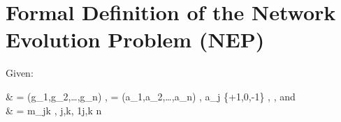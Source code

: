 \documentclass[12pt]{article}	%
\newcommand{\mys }{\hspace{0.1cm}}
\begin{document}
\section{Formal Definition of the Network Evolution Problem (NEP)} \label{sup_NEP_definition}
				\noindent Given: %
				\vspace{.3cm}
				{\small
						\begin{flalign*} %
							&\mys\mys{}  = (g_1,g_2,\dots,g_n) \textrm{, }    = (a_1,a_2,\dots,a_n)  \textrm{, }  a_j \in \{+1,0,-1\} \textrm{, } \mys{}\in{}\textrm{, \mys and }  \\
							&\mys\mys{}  = \big [m_{jk}\big ] \quad {} \quad  m_{jk} \in  {}, \mys \quad\forall j,k, \mys 1\leq j,k \leq n %
						\end{flalign*}
				}
\end{document}
